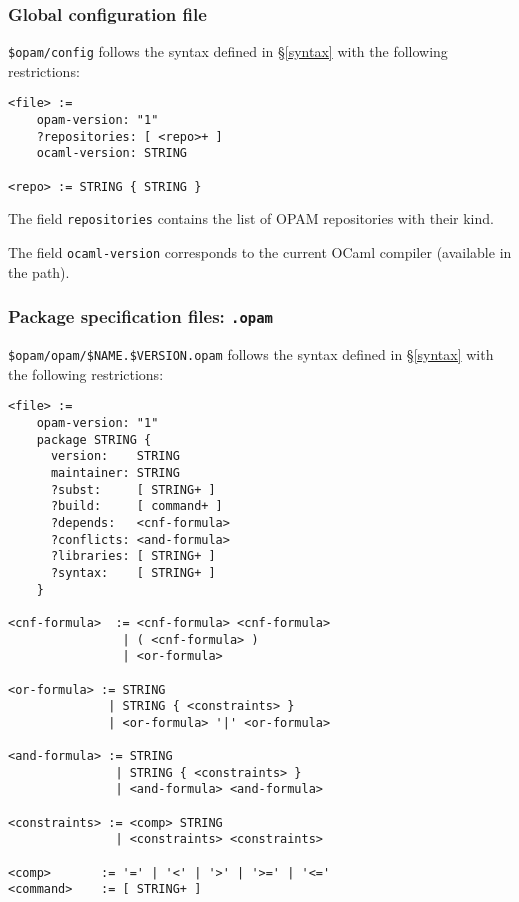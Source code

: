\documentclass[a4paper,11pt]{article}
\begin{document}
\subsubsection{Global configuration file}
\label{config}

\verb+$opam/config+ follows the syntax defined in \S\ref{syntax} with
the following restrictions:

{\small
\begin{Verbatim}[frame=single]
<file> :=
    opam-version: "1"
    ?repositories: [ <repo>+ ]
    ocaml-version: STRING

<repo> := STRING { STRING }
\end{Verbatim}
}

The field {\tt repositories} contains the list of OPAM
repositories with their kind.

The field {\tt ocaml-version} corresponds to the current OCaml
compiler (available in the path).

\subsubsection{Package specification files: {\tt .opam}}
\label{dotopam}

\verb+$opam/opam/$NAME.$VERSION.opam+ follows the syntax defined in
\S\ref{syntax} with the following restrictions:

{\small
\begin{Verbatim}[frame=single]
<file> :=
    opam-version: "1"
    package STRING {
      version:    STRING
      maintainer: STRING
      ?subst:     [ STRING+ ]
      ?build:     [ command+ ]
      ?depends:   <cnf-formula>
      ?conflicts: <and-formula>
      ?libraries: [ STRING+ ]
      ?syntax:    [ STRING+ ]
    }

<cnf-formula>  := <cnf-formula> <cnf-formula>
                | ( <cnf-formula> )
                | <or-formula>

<or-formula> := STRING
              | STRING { <constraints> }
              | <or-formula> '|' <or-formula>

<and-formula> := STRING
               | STRING { <constraints> }
               | <and-formula> <and-formula>

<constraints> := <comp> STRING
               | <constraints> <constraints>

<comp>       := '=' | '<' | '>' | '>=' | '<='
<command>    := [ STRING+ ]
\end{Verbatim}
}
\end{document}

